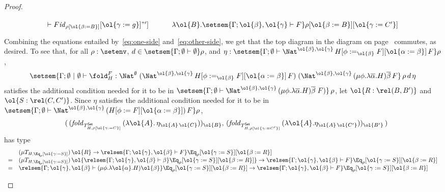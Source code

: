 \documentclass[acmsmall,review,anonymous]{acmart}
\theoremstyle{definition}
\newcommand{\set}{\mathsf{Set}}
\renewcommand{\id}{\mathit{id}}
\begin{document}
\begin{proof}
\begin{itemize}
{\begin{equation}
\begin{tikzcd}[row sep = huge]
{{      \vdash F} \id_{\rho [\ol{\beta := B}]} [\ol{\gamma := g}]}"'] &
\lambda \ol{B}.\setsem{\Gamma; \ol{\beta}, \ol{\gamma} \vdash F} \rho [\ol{\beta :=
    B}] [\ol{\gamma := C'}]
\end{tikzcd}
\end{equation}}
Combining the equations entailed by~\ref{eq:one-side}
and~\ref{eq:other-side}, we get that
the top diagram in the diagram on
  page~\pageref{page:dia1} commutes, as desired.
To see that, for all $\rho : \setenv$, $d \in
\setsem{\Gamma; \emptyset \vdash \emptyset}\rho$, and $\eta :
\setsem{\Gamma; \emptyset \vdash \Nat^{\ol{\beta},
    \ol{\gamma}}\,H[\phi :=_{\ol{\beta}} F][\ol{\alpha := \beta}]\,F}
\rho$,
\[\setsem{\Gamma; \emptyset~|~\emptyset
  \vdash \fold^F_H : \Nat^\emptyset\;(\Nat^{\ol{\beta},
    \ol{\gamma}}\,H[\phi :=_{\ol{\beta}} F][\ol{\alpha :=
      \beta}]\,F)\; (\Nat^{{\ol{\beta},\ol{\gamma}} }\,(\mu
  \phi.\lambda \overline \alpha.H)\overline \beta\,F}\,\rho\,d\,\eta\]
satisfies the additional condition needed for it to be in
$\setsem{\Gamma;\emptyset \vdash \Nat^{{\ol{\beta},\ol{\gamma}}
  }\,(\mu \phi.\lambda \overline \alpha.H)\overline \beta\;F)}\,\rho$,
let $\ol{R : \rel(B,B')}$ and $\ol{S : \rel(C,C')}$.  Since $\eta$
satisfies the additional condition needed for it to be in
$\setsem{\Gamma; \emptyset \vdash \Nat^{\ol{\beta},
    \ol{\gamma}}\,(H[\phi := F][\ol{\alpha := \beta}])\,F} \rho$,
\[\begin{array}{ll}
 & (\,(\mathit{fold}_{T^\set_{H,\rho[\ol{\gamma :=
        C}]}}\,(\lambda \ol{A}.\,\eta_{\ol{A}\,\ol{C}}))_{\ol{B}},\,
(\mathit{fold}_{T^\set_{H,\rho[\ol{\gamma :=
        C'}]}}\,(\lambda \ol{A}.\eta_{\ol{A}\,\ol{C'}}))_{\ol{B'}}\,) 
\end{array}\]
has type
\[\begin{array}{ll}
  & (\mu T_{H,\Eq_\rho[\ol{\gamma := S}]}) \,\ol{R} \to
\relsem{\Gamma;\ol{\gamma},\ol{\beta} \vdash F}\Eq_\rho[\ol{\gamma := 
    S}][\ol{\beta:= R}]\\ 
= & (\mu T_{H,\Eq_\rho[\ol{\gamma :=
      S}]})\,\ol{\relsem{\Gamma;\ol{\gamma},\ol{\beta} 
  \vdash \beta}\Eq_\rho[\ol{\gamma := S}][\ol{\beta := R}]} \to
\relsem{\Gamma;\ol{\gamma},\ol{\beta} \vdash F}\Eq_\rho[\ol{\gamma := 
    S}][\ol{\beta:= R}]\\ 
= & \relsem{\Gamma; \ol{\gamma},\ol{\beta} \vdash (\mu \phi. \lambda
  \ol{\alpha}. H)\ol{\beta}}\Eq_\rho[\ol{\gamma := S}][\ol{\beta := R}] \to
\relsem{\Gamma;\ol{\gamma},\ol{\beta} \vdash F}\Eq_\rho[\ol{\gamma := 
    S}][\ol{\beta:= R}]
\end{array}\]


\end{itemize}
\end{proof}
\end{document}
